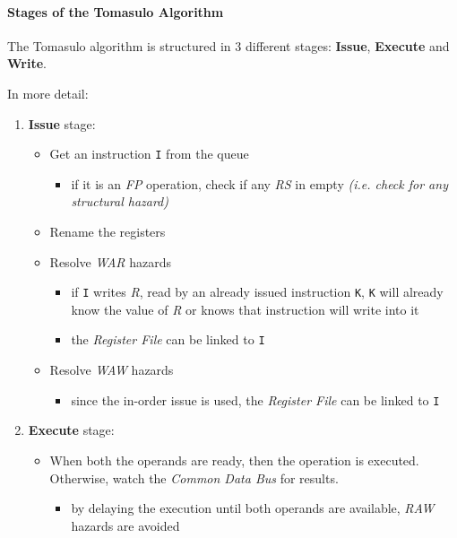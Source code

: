 \documentclass[english]{article}
\begin{document}
\paragraph{Stages of the Tomasulo Algorithm}

The Tomasulo algorithm is structured in \(3\) different stages: \textbf{Issue}, \textbf{Execute} and \textbf{Write}.

\bigskip
In more detail:

\begin{enumerate}
  \item \textbf{Issue} stage:
        \begin{itemize}
          \item Get an instruction \texttt{I} from the queue
                \begin{itemize}
                  \item if it is an \textit{FP} operation, check if any \textit{RS} in empty \textit{(i.e. check for any structural hazard)}
                \end{itemize}
          \item Rename the registers
          \item Resolve \textit{WAR} hazards
                \begin{itemize}
                  \item if \texttt{I} writes \textit{R}, read by an already issued instruction \texttt{K}, \texttt{K} will already know the value of \textit{R} or knows that instruction will write into it
                  \item the \textit{Register File} can be linked to \texttt{I}
                \end{itemize}
          \item Resolve \textit{WAW} hazards
                \begin{itemize}
                  \item since the in-order issue is used, the \textit{Register File} can be linked to \texttt{I}
                \end{itemize}
        \end{itemize}
  \item \textbf{Execute} stage:
        \begin{itemize}
          \item When both the operands are ready, then the operation is executed. Otherwise, watch the \textit{Common Data Bus} for results.
                \begin{itemize}
                  \item by delaying the execution until both operands are available, \textit{RAW} hazards are avoided

\end{itemize}
\end{itemize}
\end{enumerate}
\end{document}
